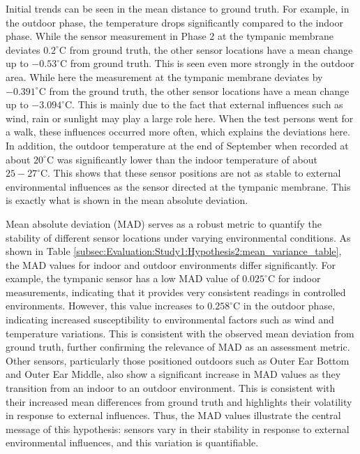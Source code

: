 Initial trends can be seen in the mean distance to ground truth.
For example, in the outdoor phase, the temperature drops significantly compared to the indoor phase.
While the sensor measurement in Phase 2 at the tympanic membrane deviates $0.2 ^\circ\text{C}$ from ground truth, the other sensor locations have a mean change up to $-0.53^\circ\text{C}$ from ground truth.
This is seen even more strongly in the outdoor area. 
While here the measurement at the tympanic membrane deviates by $-0.391 ^\circ\text{C}$ from the ground truth, the other sensor locations have a mean change up to $-3.094^\circ\text{C}$.
This is mainly due to the fact that external influences such as wind, rain or sunlight may play a large role here.
When the test persons went for a walk, these influences occurred more often, which explains the deviations here. 
In addition, the outdoor temperature at the end of September when recorded at about $20^\circ\text{C}$ was significantly lower than the indoor temperature of about $25-27^\circ\text{C}$.
This shows that these sensor positions are not as stable to external environmental influences as the sensor directed at the tympanic membrane.
This is exactly what is shown in the mean absolute deviation. 

Mean absolute deviation (MAD) serves as a robust metric to quantify the stability of different sensor locations under varying environmental conditions. 
As shown in Table \ref{subsec:Evaluation:Study1:Hypothesis2:mean_variance_table}, the MAD values for indoor and outdoor environments differ significantly. 
For example, the tympanic sensor has a low MAD value of \(0.025 ^\circ\text{C}\) for indoor measurements, indicating that it provides very consistent readings in controlled environments. 
However, this value increases to \(0.258 ^\circ\text{C}\) in the outdoor phase, indicating increased susceptibility to environmental factors such as wind and temperature variations. 
This is consistent with the observed mean deviation from ground truth, further confirming the relevance of MAD as an assessment metric. 
Other sensors, particularly those positioned outdoors such as Outer Ear Bottom and Outer Ear Middle, also show a significant increase in MAD values as they transition from an indoor to an outdoor environment. 
This is consistent with their increased mean differences from ground truth and highlights their volatility in response to external influences. 
Thus, the MAD values illustrate the central message of this hypothesis: sensors vary in their stability in response to external environmental influences, and this variation is quantifiable.

